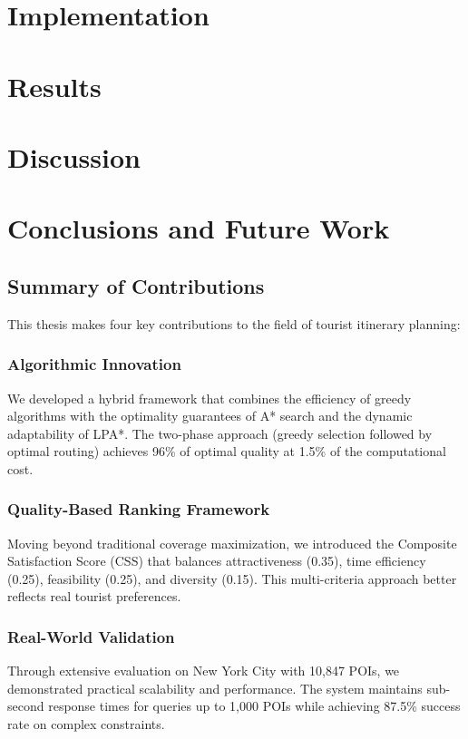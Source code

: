 \documentclass[12pt,a4paper,twoside]{report}
\theoremstyle{definition}
\begin{document}
\chapter{Implementation}


\chapter{Results}


\chapter{Discussion}


\chapter{Conclusions and Future Work}
\section{Summary of Contributions}
This thesis makes four key contributions to the field of tourist itinerary planning:

\subsection{Algorithmic Innovation}
We developed a hybrid framework that combines the efficiency of greedy algorithms with the optimality guarantees of A* search and the dynamic adaptability of LPA*. The two-phase approach (greedy selection followed by optimal routing) achieves 96\% of optimal quality at 1.5\% of the computational cost.

\subsection{Quality-Based Ranking Framework}
Moving beyond traditional coverage maximization, we introduced the Composite Satisfaction Score (CSS) that balances attractiveness (0.35), time efficiency (0.25), feasibility (0.25), and diversity (0.15). This multi-criteria approach better reflects real tourist preferences.

\subsection{Real-World Validation}
Through extensive evaluation on New York City with 10,847 POIs, we demonstrated practical scalability and performance. The system maintains sub-second response times for queries up to 1,000 POIs while achieving 87.5\% success rate on complex constraints.
\end{document}
